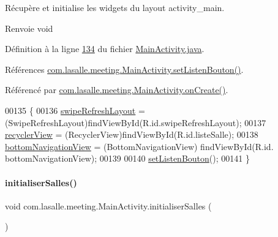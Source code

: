 Récupère et initialise les widgets du layout activity\+\_\+main. 

\begin{DoxyReturn}{Renvoie}
void 
\end{DoxyReturn}


Définition à la ligne \hyperlink{_main_activity_8java_source_l00134}{134} du fichier \hyperlink{_main_activity_8java_source}{Main\+Activity.\+java}.



Références \hyperlink{_main_activity_8java_source_l00147}{com.\+lasalle.\+meeting.\+Main\+Activity.\+set\+Listen\+Bouton()}.



Référencé par \hyperlink{_main_activity_8java_source_l00072}{com.\+lasalle.\+meeting.\+Main\+Activity.\+on\+Create()}.


\begin{DoxyCode}
00135     \{
00136         \hyperlink{classcom_1_1lasalle_1_1meeting_1_1_main_activity_a8feba36a47aa90a06a1df709d24799ec}{swipeRefreshLayout} = (SwipeRefreshLayout)findViewById(R.id.swipeRefreshLayout);
00137         \hyperlink{classcom_1_1lasalle_1_1meeting_1_1_main_activity_a365f2a56de5a65551e62a12708b917f8}{recyclerView} = (RecyclerView)findViewById(R.id.listeSalle);
00138         \hyperlink{classcom_1_1lasalle_1_1meeting_1_1_main_activity_abc43c4bd4402dd5b7066773a2276244b}{bottomNavigationView} = (BottomNavigationView) findViewById(R.id.
      bottomNavigationView);
00139 
00140         \hyperlink{classcom_1_1lasalle_1_1meeting_1_1_main_activity_a6bd5bed490e4679df4c4edbb0ce9a4cc}{setListenBouton}();
00141     \}
\end{DoxyCode}
\mbox{\label{classcom_1_1lasalle_1_1meeting_1_1_main_activity_a9be385d267f1d26e32c21d119bc65343}} 
\paragraph{\texorpdfstring{initialiser\+Salles()}{initialiserSalles()}}
{\footnotesize\ttfamily void com.\+lasalle.\+meeting.\+Main\+Activity.\+initialiser\+Salles (\begin{DoxyParamCaption}{ }\end{DoxyParamCaption})\hspace{0.3cm}{\ttfamily [private]}}



